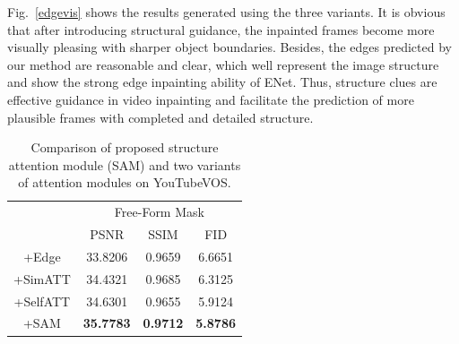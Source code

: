 Fig.~\ref{edgevis} shows the results generated using the three variants. 
It is obvious that after introducing structural guidance, the inpainted frames become more visually pleasing with sharper object boundaries. 
Besides, the edges predicted by our method are reasonable and clear, which well represent the image structure and show the strong edge inpainting ability of ENet. 
Thus, structure clues are effective guidance in video inpainting and facilitate the prediction of more plausible frames with completed and detailed structure.
 

 

\begin{table}[t]
	\caption{Comparison of proposed structure attention module (SAM) and two variants of attention modules on YouTubeVOS. }\smallskip
	\scriptsize
	\centering
	{
		\smallskip\begin{tabular}{c|c|c|c}
			\hline
			&\multicolumn{3}{c}{Free-Form Mask} \\
			\cline{2-4} 
			& PSNR & SSIM & FID\\
			
			\hline
			+Edge  &33.8206    &0.9659  &    6.6651 \\
			\hline
			
			+SimATT &34.4321    &0.9685  &   6.3125 \\
			
			\hline
			+SelfATT &34.6301 & 0.9655& 5.9124     \\
			
			\hline
			
			+SAM &\textbf{35.7783}    &\textbf{0.9712}  &   \textbf{5.8786}\\
			\hline
			
			
			
			
		\end{tabular}
	}
	\label{tab:sam_com}
\end{table}



